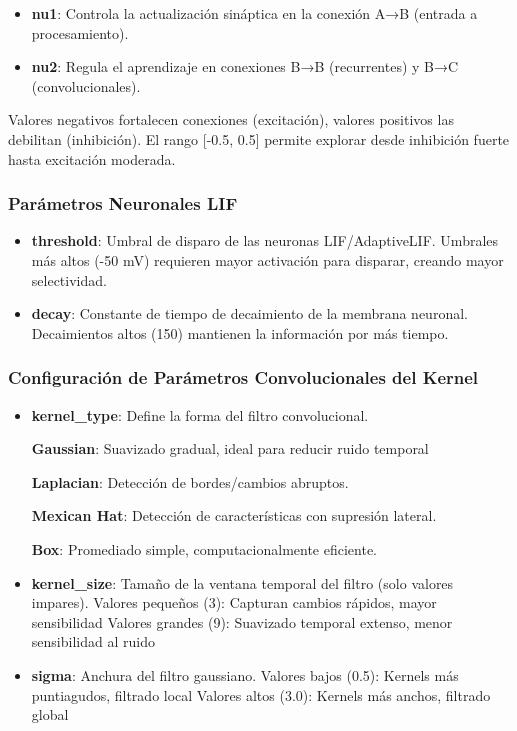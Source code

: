 \begin{itemize}
    \item \textbf{nu1}: Controla la actualización sináptica en la conexión A→B (entrada a procesamiento).
    \item \textbf{nu2}: Regula el aprendizaje en conexiones B→B (recurrentes) y B→C (convolucionales).
\end{itemize}

 Valores negativos fortalecen conexiones (excitación), valores positivos las debilitan (inhibición). El rango [-0.5, 0.5] permite explorar desde inhibición fuerte hasta excitación moderada.

\subsubsection*{Parámetros Neuronales LIF}

\begin{itemize}
    \item \textbf{threshold}:  Umbral de disparo de las neuronas LIF/AdaptiveLIF. Umbrales más altos (-50 mV) requieren mayor activación para disparar, creando mayor selectividad.
    \item \textbf{decay}: Constante de tiempo de decaimiento de la membrana neuronal. Decaimientos altos (150) mantienen la información por más tiempo.
\end{itemize}


\subsubsection{Configuración de Parámetros Convolucionales del Kernel}


\begin{itemize}
    \item \textbf{kernel\_type}: Define la forma del filtro convolucional.
    
    \textbf{Gaussian}: Suavizado gradual, ideal para reducir ruido temporal
   
    \textbf{Laplacian}: Detección de bordes/cambios abruptos.

    \textbf{Mexican Hat}: Detección de características con supresión lateral.

    \textbf{Box}: Promediado simple, computacionalmente eficiente.
    
    \item \textbf{kernel\_size}: Tamaño de la ventana temporal del filtro (solo valores impares). 
    Valores pequeños (3): Capturan cambios rápidos, mayor sensibilidad
Valores grandes (9): Suavizado temporal extenso, menor sensibilidad al ruido
    \item \textbf{sigma}: Anchura del filtro gaussiano.
    Valores bajos (0.5): Kernels más puntiagudos, filtrado local
Valores altos (3.0): Kernels más anchos, filtrado global
\end{itemize}


